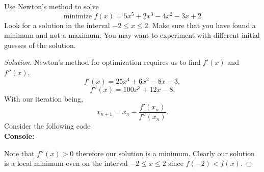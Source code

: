 \documentclass[12pt]{article}
\makeatletter
\theoremstyle{homework}
\newenvironment{exercise}[1]
{\def\@currentlabel{#1}\exercisecore}
{\endexercisecore}
\makeatother
\begin{document}
\vspace{.5in}



\begin{exercise}{3.2} Use Newton's method to solve
  \begin{equation*}
    \text{minimize } f(x) = 5x^5 + 2x^3 - 4x^2 - 3x + 2
  \end{equation*}Look for a solution in the interval $-2 \leq x \leq 2$. Make sure 
  that you have found a minimum and not a maximum. You may want to experiment with different initial guesses of the solution. 
  \begin{proof}[Solution] Newton's method for optimization requires us to find $f'(x)$ and $f''(x)$, 
    \begin{equation*}
      f'(x) = 25x^4 + 6x^2 - 8x - 3,
    \end{equation*}
    \begin{equation*}
      f''(x) = 100x^3 + 12x - 8.
    \end{equation*}
    With our iteration being, 
    \begin{equation*}
      x_{n + 1} = x_n - \frac{f'(x_n)}{f''(x_n)}.
    \end{equation*}
    Consider the following code\\
    \textbf{Console:}
    \begin{center}
      
    \end{center}
    Note that $f''(x)>0$ therefore our solution is a minimum. Clearly our solution is a local minimum even on the 
    interval $-2 \leq x \leq 2$ since $f(-2) < f(x)$. 
  \end{proof}
\end{exercise}
\vspace{.5in}
\end{document}
